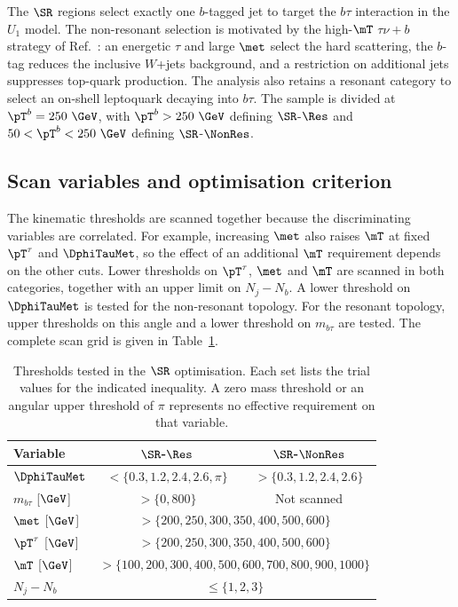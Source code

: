 The $\SR$ regions select exactly one $b$-tagged jet to target the $b\tau$ interaction in the $U_1$ model.
The non-resonant selection is motivated by the high-$\mT$ $\tau\nu+b$ strategy of Ref.~\cite{Endo2022NonResonant}: an energetic $\tau$ and large $\met$ select the hard scattering, the $b$-tag reduces the inclusive $W$+jets background, and a restriction on additional jets suppresses top-quark production.
The analysis also retains a resonant category to select an on-shell leptoquark decaying into $b\tau$.
The sample is divided at $\pT^b=250~\GeV$, with $\pT^b>250~\GeV$ defining $\SR$-$\Res$ and $50<\pT^b<250~\GeV$ defining $\SR$-$\NonRes$.

\subsection{Scan variables and optimisation criterion}
\label{subsec:ch7_scan}

The kinematic thresholds are scanned together because the discriminating variables are correlated.
For example, increasing $\met$ also raises $\mT$ at fixed $\pT^\tau$ and $\DphiTauMet$, so the effect of an additional $\mT$ requirement depends on the other cuts.
Lower thresholds on $\pT^\tau$, $\met$ and $\mT$ are scanned in both categories, together with an upper limit on $N_j-N_b$.
A lower threshold on $\DphiTauMet$ is tested for the non-resonant topology.
For the resonant topology, upper thresholds on this angle and a lower threshold on $m_{b\tau}$ are tested.
The complete scan grid is given in Table~\ref{tab:ch7_scan_variables}.

\begin{table}[htbp]
    \centering
    \small
    \caption{Thresholds tested in the $\SR$ optimisation. Each set lists the trial values for the indicated inequality. A zero mass threshold or an angular upper threshold of $\pi$ represents no effective requirement on that variable.}
    \label{tab:ch7_scan_variables}
    \begin{tabular}{lcc}
        \toprule
        Variable & $\SR$-$\Res$ & $\SR$-$\NonRes$ \\
        \midrule
        $\DphiTauMet$ & $<\{0.3,1.2,2.4,2.6,\pi\}$ & $>\{0.3,1.2,2.4,2.6\}$ \\
        $m_{b\tau}$ [$\GeV$] & $>\{0,800\}$ & Not scanned \\
        $\met$ [$\GeV$] & \multicolumn{2}{c}{$>\{200,250,300,350,400,500,600\}$} \\
        $\pT^\tau$ [$\GeV$] & \multicolumn{2}{c}{$>\{200,250,300,350,400,500,600\}$} \\
        $\mT$ [$\GeV$] & \multicolumn{2}{c}{$>\{100,200,300,400,500,600,700,800,900,1000\}$} \\
        $N_j-N_b$ & \multicolumn{2}{c}{$\leq\{1,2,3\}$} \\
        \bottomrule
    \end{tabular}
\end{table}

